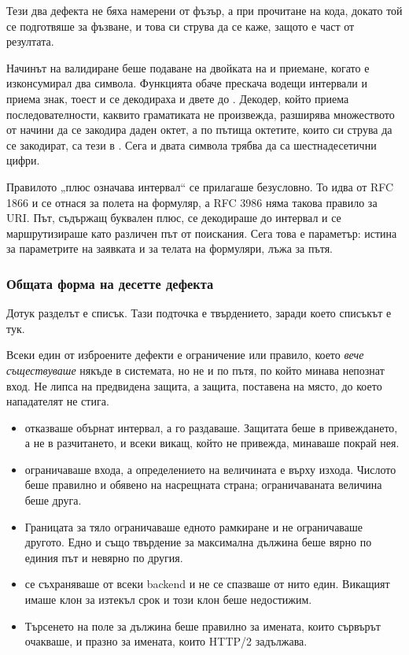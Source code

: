 Тези два дефекта не бяха намерени от фъзър, а при прочитане на кода, докато той се
подготвяше за фъзване, и това си струва да се каже, защото е част от резултата.

Начинът на валидиране беше подаване на двойката на  и приемане, когато
 е изконсумирал два символа. Функцията  обаче прескача водещи
интервали и приема знак, тоест  и  се декодираха и двете до
. Декодер, който приема последователности, каквито граматиката не произвежда,
разширява множеството от начини да се закодира даден октет, а по пътища октетите, които си
струва да се закодират, са тези в . Сега и двата символа трябва да са
шестнадесетични цифри.

Правилото „плюс означава интервал“ се прилагаше безусловно. То идва от RFC 1866 и се отнася
за полета на формуляр, а RFC 3986 няма такова правило за URI. Път, съдържащ буквален плюс,
се декодираше до интервал и се маршрутизираше като различен път от поискания. Сега това е
параметър: истина за параметрите на заявката и за телата на формуляри, лъжа за пътя.

\subsubsection{Общата форма на десетте дефекта}
\label{sec:fuzzform}

Дотук разделът е списък. Тази подточка е твърдението, заради което списъкът е тук.

Всеки един от изброените дефекти е ограничение или правило, което \emph{вече съществуваше}
някъде в системата, но не и по пътя, по който минава непознат вход. Не липса на предвидена
защита, а защита, поставена на място, до което нападателят не стига.

\begin{itemize}
\item {} отказваше обърнат интервал, а  го раздаваше. Защитата
беше в привеждането, а не в разчитането, и всеки викащ, който не привежда, минаваше покрай
нея.
\item {} ограничаваше входа, а определението на величината е
върху изхода. Числото беше правилно и обявено на насрещната страна; ограничаваната величина
беше друга.
\item Границата за тяло ограничаваше едното рамкиране и не ограничаваше другото. Едно и също
твърдение за максимална дължина беше вярно по единия път и невярно по другия.
\item {} се съхраняваше от всеки backend и не се спазваше от нито един.
Викащият имаше клон за изтекъл срок и този клон беше недостижим.
\item Търсенето на поле за дължина беше правилно за имената, които сървърът очакваше, и
празно за имената, които HTTP/2 задължава.
\end{itemize}

